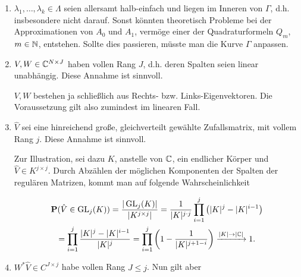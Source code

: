\begin{enumerate}[label = \arabic*.]

    \item $\lambda_1, \dots, \lambda_k \in \Lambda$ seien allersamt halb-einfach und liegen im Inneren von $\Gamma$, d.h. insbesondere nicht darauf.
    Sonst könnten theoretisch Probleme bei der Approximationen von $A_0$ und $A_1$, vermöge einer der Quadraturformeln $Q_m$, $m \in \mathbb{N}$, entstehen.
    Sollte dies passieren, müsste man die Kurve $\Gamma$ anpassen.

    \item $V, W \in \mathbb{C}^{N \times J}$ haben vollen Rang $J$, d.h. deren Spalten seien linear unabhängig.
    Diese Annahme ist sinnvoll.

    $V, W$ bestehen ja schließlich aus Rechts- bzw. Links-Eigenvektoren.
    Die Voraussetzung gilt also zumindest im linearen Fall.
    
    \item $\hat V$ sei eine hinreichend große, gleichverteilt gewählte Zufallsmatrix, mit vollem Rang $j$.
    Diese Annahme ist sinnvoll.

    Zur Illustration, sei dazu $K$, anstelle von $\mathbb{C}$, ein endlicher Körper und $\hat V \in K^{j \times j}$.
    Durch Abzählen der möglichen Komponenten der Spalten der regulären Matrizen, kommt man auf folgende Wahrscheinlichkeit

    \begin{multline*}
        \mathbf{P}(\hat V \in \operatorname{GL}_j(K))
        =
        \frac
        {
            |\operatorname{GL}_j(K)|
        }{
            |K^{j \times j}|
        }
        =
        \frac{1}
        {
            |K|^{j \cdot j}
        }
        \prod_{i=1}^j
            {\left ( 
                |K|^j - |K|^{i-1}
             \right )} \\
        =
        \prod_{i=1}^j
            \frac
            {
                |K|^j - |K|^{i-1}
            }{
                |K|^j
            }
        =
        \prod_{i=1}^j
            {\left ( 
                1 - \frac{1}{|K|^{j + 1 - i}}
             \right )}
        \xrightarrow{|K| \to |\mathbb{C}|}
        1.
    \end{multline*}

    \item $W^\ast \hat V \in C^{J \times j}$ habe vollen Rang $J \leq j$.
    Nun gilt aber


\end{enumerate}
